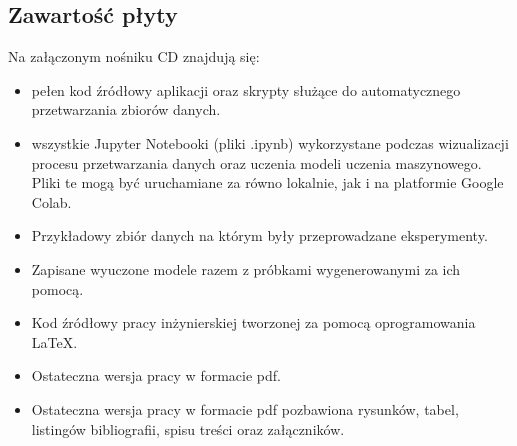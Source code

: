 \begin{appendices}

\chapter{Zawartość płyty}
{
    Na załączonym nośniku CD znajdują się:

    \begin{itemize}
        \setlength\itemsep{-0.5em}
        \item pełen kod źródłowy aplikacji oraz skrypty służące do automatycznego przetwarzania zbiorów danych.
        \item wszystkie Jupyter Notebooki (pliki .ipynb) wykorzystane podczas wizualizacji procesu przetwarzania danych oraz uczenia modeli uczenia maszynowego. Pliki te mogą być uruchamiane za równo lokalnie, jak i na platformie Google Colab.
        \item Przykładowy zbiór danych na którym były przeprowadzane eksperymenty.
        \item Zapisane wyuczone modele razem z próbkami wygenerowanymi za ich pomocą.
        \item Kod źródłowy pracy inżynierskiej tworzonej za pomocą oprogramowania LaTeX.
        \item Ostateczna wersja pracy w formacie pdf.
        \item Ostateczna wersja pracy w formacie pdf pozbawiona rysunków, tabel, listingów bibliografii, spisu treści oraz załączników.
    \end{itemize}
}

\end{appendices}